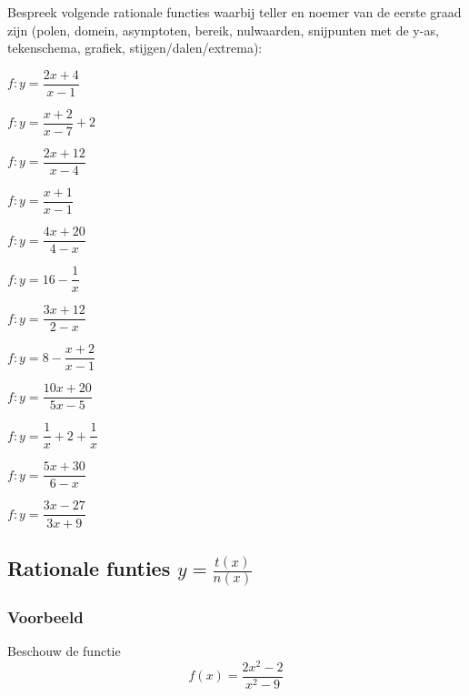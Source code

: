 \documentclass[12pt,twoside,a4paper]{article}
\begin{document}
\begin{oefening}
Bespreek volgende rationale functies waarbij teller en noemer van de eerste graad zijn (polen, domein, asymptoten, bereik, nulwaarden, snijpunten met de y-as, tekenschema, grafiek, stijgen/dalen/extrema):
\begin{exlist}{3}
\item $f:y=\dfrac{2x+4}{x-1}$
\item $f:y=\dfrac{x+2}{x-7}+2$
\item $f:y=\dfrac{2x+12}{x-4}$
\item $f:y=\dfrac{x+1}{x-1}$
\item $f:y=\dfrac{4x+20}{4-x}$
\item $f:y=16-\dfrac{1}{x}$
\item $f:y=\dfrac{3x+12}{2-x}$
\item $f:y=8-\dfrac{x+2}{x-1}$
\item $f:y=\dfrac{10x+20}{5x-5}$
\item $f:y=\dfrac{1}{x}+2+\dfrac{1}{x}$
\item $f:y=\dfrac{5x+30}{6-x}$
\item $f:y=\dfrac{3x-27}{3x+9}$
\end{exlist}
\end{oefening}

\subsection{Rationale funties $y=\frac{t(x)}{n(x)}$}

\subsubsection*{Voorbeeld}
Beschouw de functie
$$f(x)=\dfrac{2x^2-2}{x^2-9}$$

\begin{center}
\end{center}
\end{document}
